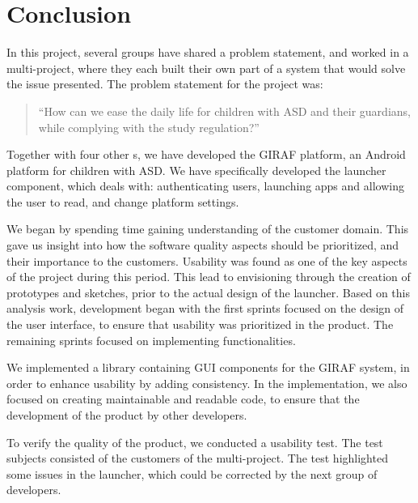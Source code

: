 \chapter{Conclusion}
In this project, several groups have shared a problem statement, and worked in a multi-project, where they each built their own part of a system that would solve the issue presented. 
The problem statement for the project was:    
 
\begin{quotation}
``How can we ease the daily life for children with ASD and their guardians, while complying with the study regulation?''
\end{quotation}

Together with four other \localgroup[]s, we have developed the GIRAF platform, an Android platform for children with ASD.
We have specifically developed the launcher component, which deals with: authenticating users, launching apps and allowing the user to read, and change platform settings. 

We began by spending time gaining understanding of the customer domain. 
This gave us insight into how the software quality aspects should be prioritized, and their importance to the customers. 
Usability was found as one of the key aspects of the project during this period.
This lead to envisioning through the creation of prototypes and sketches, prior to the actual design of the launcher. 
Based on this analysis work, development began with the first sprints focused on the design of the user interface, to ensure that usability was prioritized in the product.
The remaining sprints focused on implementing functionalities.

We implemented a library containing GUI components for the GIRAF system, in order to enhance usability by adding consistency. 
In the implementation, we also focused on creating maintainable and readable code, to ensure that the development of the product by other developers.

To verify the quality of the product, we conducted a usability test. The test subjects consisted of the customers of the multi-project. The test highlighted some issues in the launcher, which could be corrected by the next group of developers.